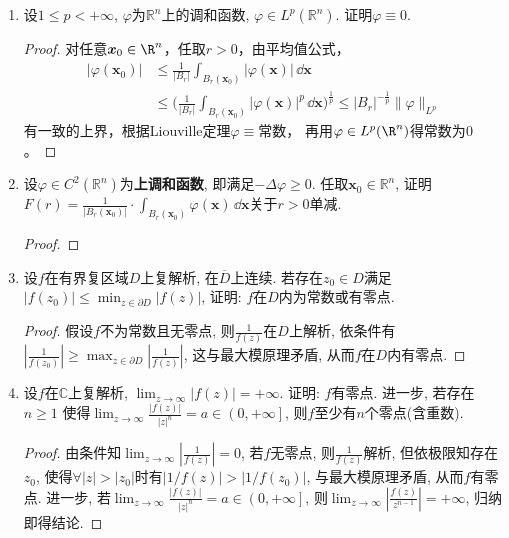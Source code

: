 \begin{quiza}
\begin{enumerate}
\item 设\(1\leqslant p<+\infty\), \(\varphi\)为\(\mathbb{R}^n\)上的调和函数, 
\(\varphi\in L^p(\mathbb{R}^n)\). 证明\(\varphi\equiv 0\).
\begin{proof}
对任意$\boldsymbol{x}_0\in\R^n$，任取$r>0$，由平均值公式，
\begin{align*}|\varphi(\boldsymbol{x}_0)|
&\leqslant\frac{1}{|B_r|}\int_{B_r(\boldsymbol{x}_0)}|\varphi(\boldsymbol{x})|\,\dd\boldsymbol{x}\\
&\leqslant\bigg(\frac{1}{|B_r|}\int_{B_r(\boldsymbol{x}_0)}|\varphi(\boldsymbol{x})|^p\,\dd\boldsymbol{x}\bigg)^\frac{1}{p}
\leqslant|B_r|^{-\frac{1}{p}}\|\varphi\|_{L^p}\end{align*}
有一致的上界，根据Liouville定理$\varphi\equiv$常数，
再用$\varphi\in L^p(\R^n)$得常数为$0$。
\end{proof}

\item 设\(\varphi\in C^2(\mathbb{R}^n)\)为\textbf{上调和函数}, 
即满足\(-\Delta\varphi\geqslant 0\). 任取\(\boldsymbol{x}_0\in\mathbb{R}^n\), 
证明\(F(r)=\frac{1}{|B_r(\boldsymbol{x}_0)|}
\cdot\int_{B_r(\boldsymbol{x}_0)}\varphi(\boldsymbol{x})\,\dd\boldsymbol{x}\)关于\(r>0\)单减.
\begin{proof}

\end{proof}

\item 设\(f\)在有界复区域\(D\)上复解析, 在\(\overline{D}\)上连续. 
若存在\(z_0\in D\)满足\(|f(z_0)|\leqslant\min_{z\in\partial D}|f(z)|\), 
证明: \(f\)在\(D\)内为常数或有零点.
\begin{proof}
假设\(f\)不为常数且无零点, 则\(\frac{1}{f(z)}\)在\(D\)上解析, 
依条件有\(\left|\frac{1}{f(z_0)}\right|
\geqslant\max_{z\in\partial D}\left|\frac{1}{f(z)}\right|\), 
这与最大模原理矛盾, 从而\(f\)在\(D\)内有零点.
\end{proof}

\item 设\(f\)在\(\mathbb{C}\)上复解析, \(\lim_{z\rightarrow\infty}|f(z)|=+\infty\). 
证明: \(f\)有零点. 进一步, 若存在\(n\geqslant 1\)
使得\(\lim_{z\rightarrow\infty}\frac{|f(z)|}{|z|^n}
=a\in\left(0,+\infty\right]\), 则\(f\)至少有\(n\)个零点(含重数).
\begin{proof}
由条件知\(\lim_{z\rightarrow\infty}\left|\frac{1}{f(z)}\right|=0\), 
若\(f\)无零点, 则\(\frac{1}{f(z)}\)解析, 但依极限知存在\(z_0\), 
使得\(\forall |z|>|z_0|\)时有\(\left|1/f(z)\right|>\left|1/f(z_0)\right|\), 
与最大模原理矛盾, 从而\(f\)有零点. 
进一步, 若\(\lim_{z\rightarrow\infty}\frac{\left|f(z)\right|}{|z|^n}
=a\in\left(0,+\infty\right]\), 
则\(\lim_{z\rightarrow\infty}\left|\frac{f(z)}{z^{n-1}}\right|=+\infty\), 
归纳即得结论. 
\end{proof}


\end{enumerate}
\end{quiza}
